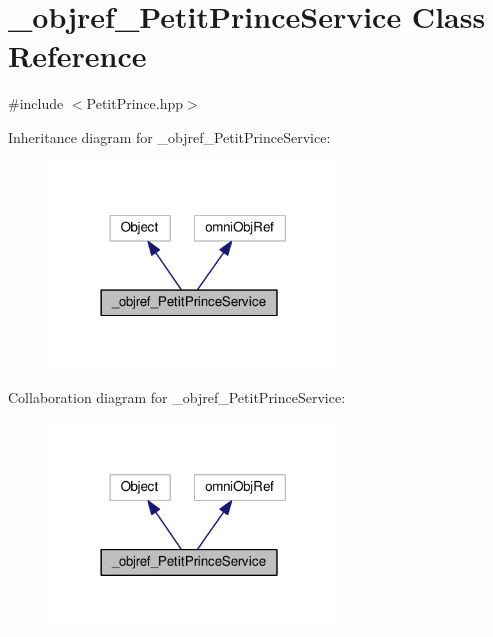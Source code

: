 \hypertarget{class__objref___petit_prince_service}{}\section{\+\_\+objref\+\_\+\+Petit\+Prince\+Service Class Reference}
\label{class__objref___petit_prince_service}


{\ttfamily \#include $<$Petit\+Prince.\+hpp$>$}



Inheritance diagram for \+\_\+objref\+\_\+\+Petit\+Prince\+Service\+:
\nopagebreak
\begin{figure}[H]
\begin{center}
\leavevmode
\includegraphics[width=218pt]{class__objref___petit_prince_service__inherit__graph}
\end{center}
\end{figure}


Collaboration diagram for \+\_\+objref\+\_\+\+Petit\+Prince\+Service\+:
\nopagebreak
\begin{figure}[H]
\begin{center}
\leavevmode
\includegraphics[width=218pt]{class__objref___petit_prince_service__coll__graph}
\end{center}
\end{figure}
